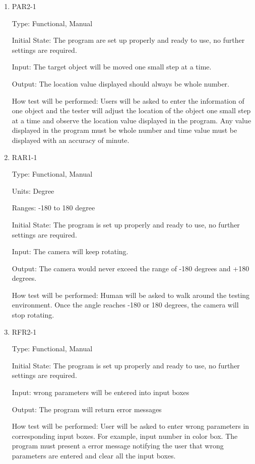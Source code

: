 \documentclass[12pt, titlepage]{article}
\begin{document}
\begin{enumerate}
\item{PAR2-1\\}

Type: Functional, Manual
					
Initial State: The program are set up properly and ready to use, no further settings are required.
					
Input: The target object will be moved one small step at a time.
					
Output: The location value displayed should always be whole number.
					
How test will be performed: Users will be asked to enter the information of one object and the tester will adjust the location of the object one small step at a time and observe the location value displayed in the program. Any value displayed in the program must be whole number and time value must be displayed with an accuracy of minute.


\item{RAR1-1\\}

Type: Functional, Manual

Units: Degree

Ranges: -180 to 180 degree
					
Initial State: The program is set up properly and ready to use, no further settings are required.
					
Input: The camera will keep rotating. 
					
Output: The camera would never exceed the range of -180 degrees and +180 degrees.
					
How test will be performed: Human will be asked to walk around the testing environment. Once the angle reaches -180 or 180 degrees, the camera will stop rotating.


\item{RFR2-1\\}

Type: Functional, Manual
					
Initial State: The program is set up properly and ready to use, no further settings are required.
					
Input: wrong parameters will be entered into input boxes 
					
Output: The program will return error messages 
					
How test will be performed: User will be asked to enter wrong parameters in corresponding input boxes. For example, input number in color box. The program must present a error message notifying the user that wrong parameters are entered and clear all the input boxes.

\end{enumerate}
\end{document}

